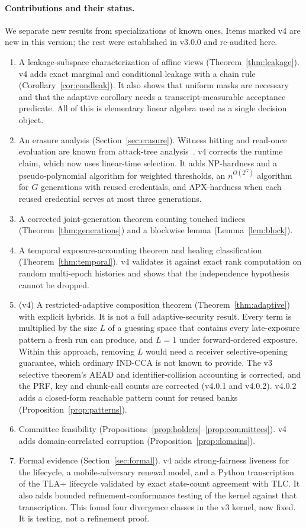 \documentclass[pdflatex,sn-mathphys-num,twocolumn]{sn-jnl}
\theoremstyle{plain}
\theoremstyle{definition}
\begin{document}
\paragraph{Contributions and their status.}
We separate new results from specializations of known ones. Items marked v4 are new in this version; the rest were established in v3.0.0 and re-audited here.
\begin{enumerate}
\item A leakage-subspace characterization of affine views (Theorem~\ref{thm:leakage}). v4 adds exact marginal and conditional leakage with a chain rule (Corollary~\ref{cor:condleak}). It also shows that uniform masks are necessary and that the adaptive corollary needs a transcript-measurable acceptance predicate. All of this is elementary linear algebra used as a single decision object.
\item An erasure analysis (Section~\ref{sec:erasure}). Witness hitting and read-once evaluation are known from attack-tree analysis~\cite{mauw2005,lopuhaa2022}. v4 corrects the runtime claim, which now uses linear-time selection. It adds NP-hardness and a pseudo-polynomial algorithm for weighted thresholds, an $n^{O(2^G)}$ algorithm for $G$ generations with reused credentials, and APX-hardness when each reused credential serves at most three generations.
\item A corrected joint-generation theorem counting touched indices (Theorem~\ref{thm:generations}) and a blockwise lemma (Lemma~\ref{lem:block}).
\item A temporal exposure-accounting theorem and healing classification (Theorem~\ref{thm:temporal}). v4 validates it against exact rank computation on random multi-epoch histories and shows that the independence hypothesis cannot be dropped.
\item (v4) A restricted-adaptive composition theorem (Theorem~\ref{thm:adaptive}) with explicit hybrids. It is not a full adaptive-security result. Every term is multiplied by the size $L$ of a guessing space that contains every late-exposure pattern a fresh run can produce, and $L=1$ under forward-ordered exposure. Within this approach, removing $L$ would need a receiver selective-opening guarantee, which ordinary IND-CCA is not known to provide. The v3 selective theorem's AEAD and identifier-collision accounting is corrected, and the PRF, key and chunk-call counts are corrected (v4.0.1 and v4.0.2). v4.0.2 adds a closed-form reachable pattern count for reused banks (Proposition~\ref{prop:patterns}).
\item Committee feasibility (Propositions~\ref{prop:holders}--\ref{prop:committees}). v4 adds domain-correlated corruption (Proposition~\ref{prop:domains}).
\item Formal evidence (Section~\ref{sec:formal}). v4 adds strong-fairness liveness for the lifecycle, a mobile-adversary renewal model, and a Python transcription of the TLA+ lifecycle validated by exact state-count agreement with TLC. It also adds bounded refinement-conformance testing of the kernel against that transcription. This found four divergence classes in the v3 kernel, now fixed. It is testing, not a refinement proof.
\end{enumerate}
\end{document}
